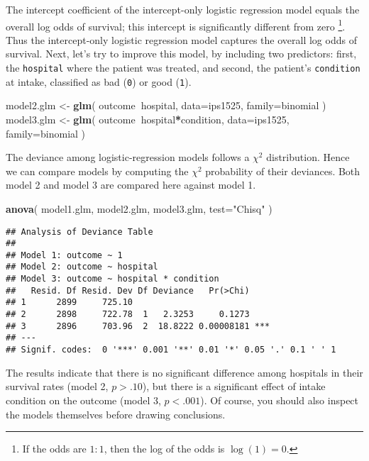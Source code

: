 \documentclass[]{book}
\newenvironment{Shaded}{\begin{snugshade}}{\end{snugshade}}
\newcommand{\DataTypeTok}[1]{\textcolor[rgb]{0.13,0.29,0.53}{#1}}
\newcommand{\KeywordTok}[1]{\textcolor[rgb]{0.13,0.29,0.53}{\textbf{#1}}}
\newcommand{\NormalTok}[1]{#1}
\newcommand{\OperatorTok}[1]{\textcolor[rgb]{0.81,0.36,0.00}{\textbf{#1}}}
\newcommand{\StringTok}[1]{\textcolor[rgb]{0.31,0.60,0.02}{#1}}
\begin{document}
The intercept coefficient of the intercept-only logistic regression
model equals the overall log odds of survival; this intercept is
significantly different from zero \footnote{If the odds are \(1:1\), then the log of the odds is \(\log(1)=0\).}. Thus the intercept-only
logistic regression model captures the overall log odds of survival.
Next, let's try to improve this model, by including two predictors:
first, the \texttt{hospital} where the patient was treated, and second, the
patient's \texttt{condition} at intake, classified as bad
(\texttt{0}) or good (\texttt{1}).

\begin{Shaded}
\begin{Highlighting}[]
\NormalTok{model2.glm <-}\StringTok{ }\KeywordTok{glm}\NormalTok{( outcome}\OperatorTok{~}\NormalTok{hospital, }\DataTypeTok{data=}\NormalTok{ips1525, }\DataTypeTok{family=}\NormalTok{binomial ) }
\NormalTok{model3.glm <-}\StringTok{ }\KeywordTok{glm}\NormalTok{( outcome}\OperatorTok{~}\NormalTok{hospital}\OperatorTok{*}\NormalTok{condition, }
                   \DataTypeTok{data=}\NormalTok{ips1525, }\DataTypeTok{family=}\NormalTok{binomial ) }
\end{Highlighting}
\end{Shaded}

The deviance among logistic-regression models follows a \(\chi^2\)
distribution. Hence we can compare models by computing the \(\chi^2\)
probability of their deviances. Both model 2 and model 3
are compared here against model 1.

\begin{Shaded}
\begin{Highlighting}[]
\KeywordTok{anova}\NormalTok{( model1.glm, model2.glm, model3.glm, }\DataTypeTok{test=}\StringTok{"Chisq"}\NormalTok{ ) }
\end{Highlighting}
\end{Shaded}

\begin{verbatim}
## Analysis of Deviance Table
## 
## Model 1: outcome ~ 1
## Model 2: outcome ~ hospital
## Model 3: outcome ~ hospital * condition
##   Resid. Df Resid. Dev Df Deviance   Pr(>Chi)    
## 1      2899     725.10                           
## 2      2898     722.78  1   2.3253     0.1273    
## 3      2896     703.96  2  18.8222 0.00008181 ***
## ---
## Signif. codes:  0 '***' 0.001 '**' 0.01 '*' 0.05 '.' 0.1 ' ' 1
\end{verbatim}

The results indicate that there is no significant difference among
hospitals in their survival rates (model 2, \(p>.10\)), but there is a
significant effect of intake condition on the outcome (model 3,
\(p<.001\)). Of course, you should also inspect the models themselves
before drawing conclusions.
\end{document}
